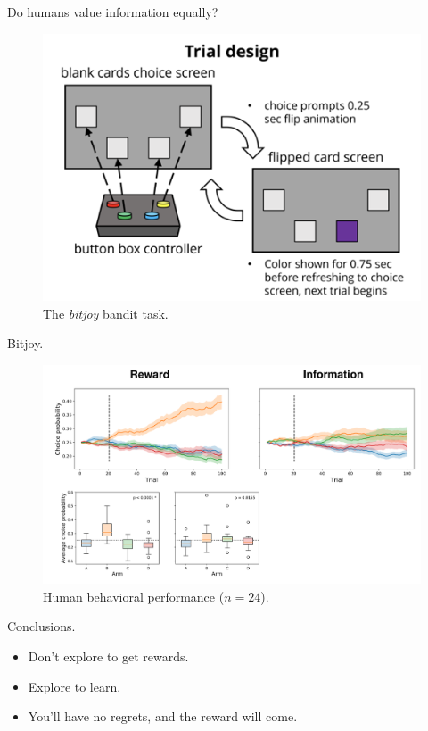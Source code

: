 \documentclass[10pt]{beamer}
\begin{document}
\begin{frame}[fragile]{Do humans value information equally?}
\begin{figure}
    \centering
    \includegraphics[scale=0.4]{images/bitjoy.png}
    \caption{The \textit{bitjoy} bandit task.}
\end{figure}
\end{frame}

\begin{frame}[fragile]{Bitjoy.}
\begin{figure}
    \centering
    \includegraphics[scale=0.3]{images/bitjoy_main_results.png}
    \caption{Human behavioral performance ($n=24$).}
\end{figure}
\end{frame}

\begin{frame}[fragile]{Conclusions.}
\begin{itemize}
    \item Don't explore to get rewards.
    \item Explore to learn.
    \item You'll have no regrets, and the reward will come.
\end{itemize}
\end{frame}
\end{document}
